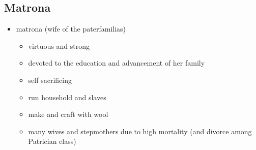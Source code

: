 \documentclass[12pt, twoside]{article}
\begin{document}
\subsection{Matrona}
\begin{itemize}
\item matrona (wife of the paterfamilias)
	\begin{itemize}
	\item virtuous and strong
	\item devoted to the education and advancement of her family
	\item self sacrificing
	\item run household and slaves
	\item make and craft with wool
	\item many wives and stepmothers due to high mortality (and divorce among Patrician class)
	\end{itemize}
\end{itemize}
\end{document}
